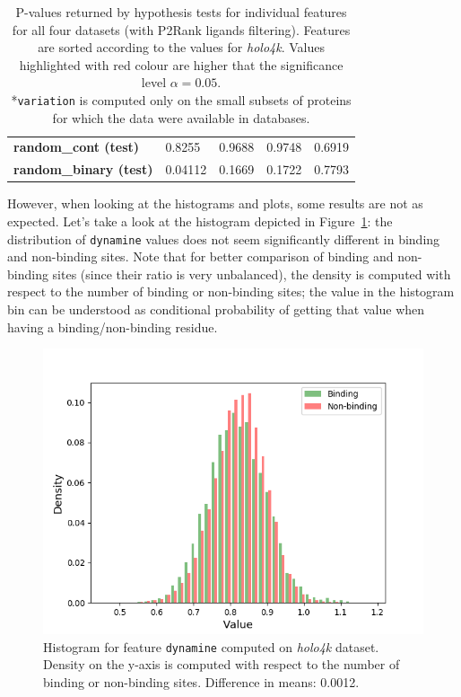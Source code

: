\begin{table}[]
\begin{tabular}{@{}lllll@{}}
\textbf{random\_cont (test)}         & \cellcolor[HTML]{F54D4D}0.8255         & \cellcolor[HTML]{F54D4D}0.9688           & \cellcolor[HTML]{F54D4D}0.9748         & \cellcolor[HTML]{F54D4D}0.6919         \\
\textbf{random\_binary (test)}       & 0.04112                                & \cellcolor[HTML]{F54D4D}0.1669           & \cellcolor[HTML]{F54D4D}0.1722         & \cellcolor[HTML]{F54D4D}0.7793         \\ \bottomrule
\end{tabular}
\caption{P-values returned by hypothesis tests for individual features for all four datasets (with P2Rank ligands filtering). Features are sorted according to the values for \textit{holo4k}. Values highlighted with red colour are higher that the significance level $\alpha = 0.05$.\\\hspace{\textwidth}
*\texttt{variation} is computed only on the small subsets of proteins for which the data were available in databases.}
\label{tab:pvaluesAll}
\end{table}

However, when looking at the histograms and plots, some results are not as expected. Let's take a look at the histogram depicted in Figure~\ref{fig:dynamine}: the distribution of \texttt{dynamine} values does not seem significantly different in binding and non-binding sites. Note that for better comparison of binding and non-binding sites (since their ratio is very unbalanced), the density is computed with respect to the number of binding or non-binding sites; the value in the histogram bin can be understood as conditional probability of getting that value when having a binding/non-binding residue.

\begin{figure}[!htbp]
\centering
\includegraphics[width=120mm]{../img/dynamine_hist.png}
\caption{Histogram for feature \texttt{dynamine} computed on \textit{holo4k} dataset. Density on the y-axis is computed with respect to the number of binding or non-binding sites. Difference in means: 0.0012.}
\label{fig:dynamine}
\end{figure}

